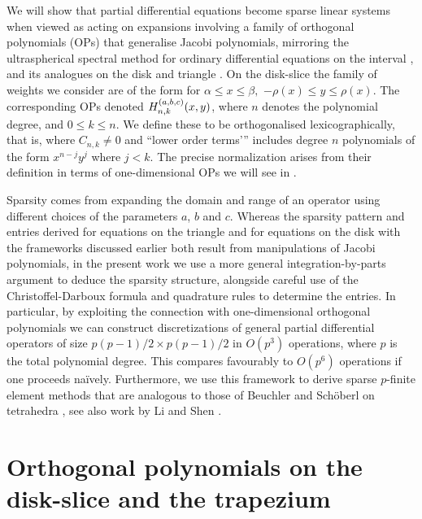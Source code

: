 We will show that partial differential equations become sparse linear systems when viewed as acting on expansions involving a family of orthogonal polynomials (OPs) that generalise Jacobi polynomials, mirroring the ultraspherical spectral method for ordinary differential equations on the interval \cite{olver2013fast}, and its analogues on the disk \cite{vasil2016tensor} and triangle \cite{olver2018recurrence,olver2019triangle}. On the disk-slice the family of weights we consider are of the form
for $\alpha \leq x \leq \beta,$ $-\rho(x) \leq y \leq \rho(x)$. The corresponding OPs denoted $H_{n,k}^{(a,b,c)}(x,y)$, where $n$ denotes the polynomial degree, and $0 \le k \le n$. We define these to be orthogonalised lexicographically, that is,
where $C_{n,k} \neq 0$ and \enquote{lower order terms'} includes degree $n$ polynomials of the form $x^{n-j} y^j$ where $j < k$. The precise normalization arises from their definition in terms of one-dimensional OPs we will see in .

Sparsity comes from expanding the domain and range of an operator using different choices of the parameters $a$, $b$ and $c$. Whereas the sparsity pattern and entries derived for equations on the triangle \cite{olver2018recurrence, olver2019triangle} and for equations on the disk \cite{vasil2016tensor} with the frameworks discussed earlier both result from manipulations of Jacobi polynomials, in the present work we use a more general integration-by-parts argument to deduce the sparsity structure, alongside careful use of the Christoffel-Darboux formula \cite[18.2.2]{DLMF} and quadrature rules to determine the entries. In particular, by exploiting the connection with one-dimensional orthogonal polynomials we can construct discretizations of general partial differential operators of size $p(p-1)/2 \times p(p-1)/2$ in $O(p^3)$ operations, where $p$ is the total polynomial degree. This compares favourably to $O(p^6)$ operations if one proceeds na\"ively. Furthermore, we use this framework to derive sparse $p$-finite element methods that are analogous to those of Beuchler and Sch\"oberl on tetrahedra \cite{beuchler2006new}, see also work by Li and Shen \cite{li2010optimal}.



\section{Orthogonal polynomials on the disk-slice and the trapezium}\label{Section:OPs}

